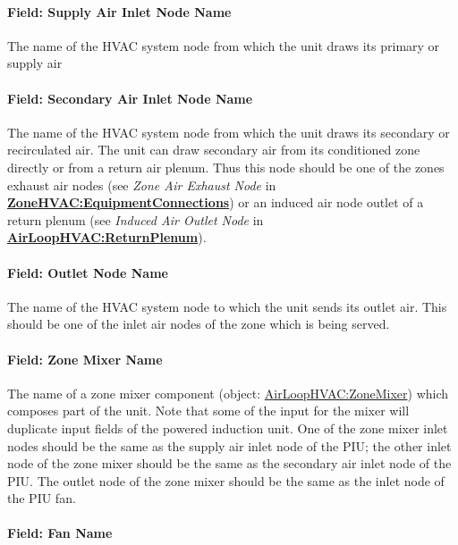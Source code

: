 \paragraph{Field: Supply Air Inlet Node Name}\label{field-supply-air-inlet-node-name}

The name of the HVAC system node from which the unit draws its primary or supply air

\paragraph{Field: Secondary Air Inlet Node Name}\label{field-secondary-air-inlet-node-name}

The name of the HVAC system node from which the unit draws its secondary or recirculated air. The unit can draw secondary air from its conditioned zone directly or from a return air plenum. Thus this node should be one of the zones exhaust air nodes (see \emph{Zone Air Exhaust Node} in \textbf{\hyperref[zonehvacequipmentconnections]{ZoneHVAC:EquipmentConnections}}) or an induced air node outlet of a return plenum (see \emph{Induced Air Outlet Node} in \textbf{\hyperref[airloophvacreturnplenum]{AirLoopHVAC:ReturnPlenum}}).

\paragraph{Field: Outlet Node Name}\label{field-outlet-node-name}

The name of the HVAC system node to which the unit sends its outlet air. This should be one of the inlet air nodes of the zone which is being served.

\paragraph{Field: Zone Mixer Name}\label{field-zone-mixer-name}

The name of a zone mixer component (object: \hyperref[airloophvaczonemixer]{AirLoopHVAC:ZoneMixer}) which composes part of the unit. Note that some of the input for the mixer will duplicate input fields of the powered induction unit. One of the zone mixer inlet nodes should be the same as the supply air inlet node of the PIU; the other inlet node of the zone mixer should be the same as the secondary air inlet node of the PIU. The outlet node of the zone mixer should be the same as the inlet node of the PIU fan.

\paragraph{Field: Fan Name}\label{field-fan-name-1}


